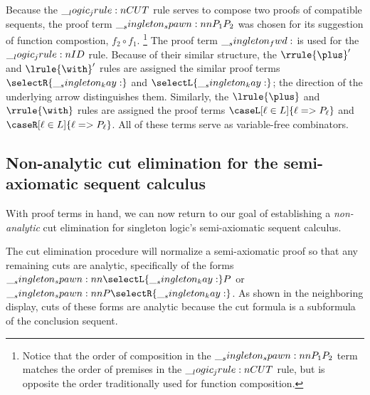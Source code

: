 Because the $\__logic_jrule:n {CUT}$ rule serves to compose two proofs of compatible sequents, the proof term $\__singleton_spawn:nn {P_1} {P_2}$ was chosen for its suggestion of function compostion, $f_2 \circ f_1$.%
\footnote{Notice that the order of composition in the $\__singleton_spawn:nn {P_1} {P_2}$ term matches the order of premises in the $\__logic_jrule:n {CUT}$ rule, but is opposite the order traditionally used for function composition.}
The proof term $\__singleton_fwd:$ is used for the $\__logic_jrule:n {ID}$ rule.
%
Because of their similar structure, the $\rrule{\plus}'$ and $\lrule{\with}'$ rules are assigned the similar proof terms $\selectR{\kay}$ and $\selectL{\kay}$; the direction of the underlying arrow distinguishes them.
Similarly, the $\lrule{\plus}$ and $\rrule{\with}$ rules are assigned the proof terms $\caseL[\ell \in L]{\ell => P_{\ell}}$ and $\caseR[\ell \in L]{\ell => P_{\ell}}$.
%
All of these terms serve as variable-free combinators.%
%
\subsection{Non-analytic cut elimination for the semi-axiomatic sequent calculus}

With proof terms in hand, we can now return to our goal of establishing a \emph{non-analytic} cut elimination  for singleton logic's semi-axiomatic sequent calculus.

The cut elimination procedure will normalize a semi-axiomatic proof so that any remaining cuts are analytic, specifically of the forms $\spawn{\selectL{\kay}}{P}$ or $\spawn{P}{\selectR{\kay}}$.
As shown in the neighboring display,%
%
%
cuts of these forms are analytic because the cut formula is a subformula of the conclusion sequent.

